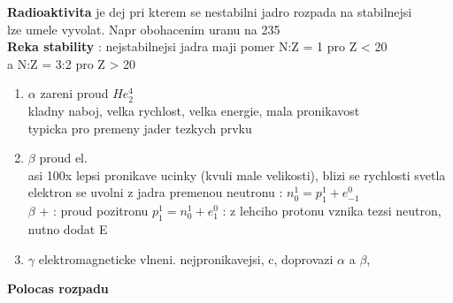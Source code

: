 \documentclass{report}
\begin{document}
\textbf{Radioaktivita} je dej pri kterem se nestabilni jadro rozpada na stabilnejsi \\
lze umele vyvolat. Napr obohacenim uranu na 235 \\
\textbf{Reka stability} : nejstabilnejsi jadra maji pomer N:Z = 1 pro Z < 20 \\
a N:Z = 3:2 pro Z > 20 \\
\begin{enumerate}[label=\bfseries\tiny\protect\circled{\small\arabic*}]
  \item $\alpha$ zareni proud  $He_2^4$ \\
    kladny naboj, velka rychlost, velka energie, mala pronikavost \\
    typicka pro premeny jader tezkych prvku \\
  \item $\beta$ proud el. \\
    asi 100x lepsi pronikave ucinky (kvuli male velikosti), blizi se rychlosti svetla \\
    elektron se uvolni z jadra premenou neutronu : $n_0^1=p_1^1+e_{-1}^0$ \\
    $\beta$ + : proud pozitronu $p_1^1=n_0^1+e_{1}^0$ : z lehciho protonu vznika tezsi neutron, nutno dodat E \\
  \item $\gamma$ elektromagneticke vlneni. nejpronikavejsi, c, doprovazi $\alpha$ a $\beta$,  \\
\end{enumerate}

\textbf{Polocas rozpadu}  \\
\end{document}
